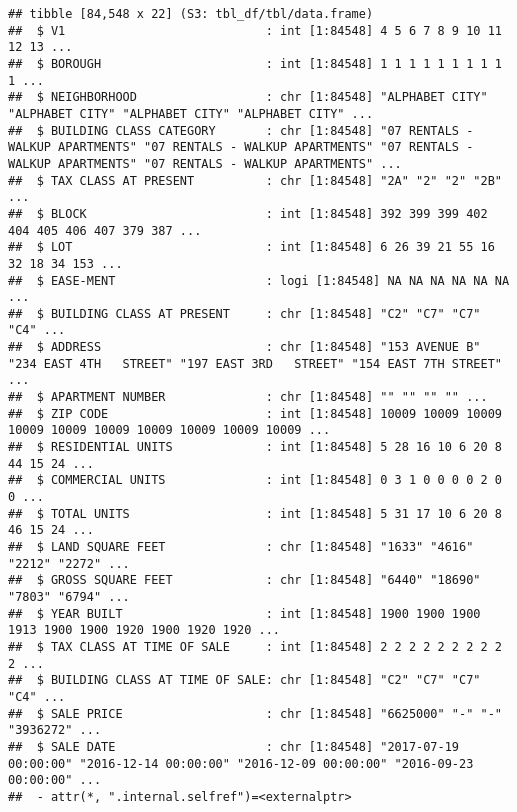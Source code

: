 \documentclass[
  a3paper,
]{article}
\newenvironment{Shaded}{\begin{snugshade}}{\end{snugshade}}
\newcommand{\CommentTok}[1]{\textcolor[rgb]{0.56,0.35,0.01}{\textit{#1}}}
\newcommand{\KeywordTok}[1]{\textcolor[rgb]{0.13,0.29,0.53}{\textbf{#1}}}
\newcommand{\NormalTok}[1]{#1}
\newcommand{\OperatorTok}[1]{\textcolor[rgb]{0.81,0.36,0.00}{\textbf{#1}}}
\newcommand{\OtherTok}[1]{\textcolor[rgb]{0.56,0.35,0.01}{#1}}
\newcommand{\StringTok}[1]{\textcolor[rgb]{0.31,0.60,0.02}{#1}}
\begin{document}
\begin{verbatim}
## tibble [84,548 x 22] (S3: tbl_df/tbl/data.frame)
##  $ V1                            : int [1:84548] 4 5 6 7 8 9 10 11 12 13 ...
##  $ BOROUGH                       : int [1:84548] 1 1 1 1 1 1 1 1 1 1 ...
##  $ NEIGHBORHOOD                  : chr [1:84548] "ALPHABET CITY" "ALPHABET CITY" "ALPHABET CITY" "ALPHABET CITY" ...
##  $ BUILDING CLASS CATEGORY       : chr [1:84548] "07 RENTALS - WALKUP APARTMENTS" "07 RENTALS - WALKUP APARTMENTS" "07 RENTALS - WALKUP APARTMENTS" "07 RENTALS - WALKUP APARTMENTS" ...
##  $ TAX CLASS AT PRESENT          : chr [1:84548] "2A" "2" "2" "2B" ...
##  $ BLOCK                         : int [1:84548] 392 399 399 402 404 405 406 407 379 387 ...
##  $ LOT                           : int [1:84548] 6 26 39 21 55 16 32 18 34 153 ...
##  $ EASE-MENT                     : logi [1:84548] NA NA NA NA NA NA ...
##  $ BUILDING CLASS AT PRESENT     : chr [1:84548] "C2" "C7" "C7" "C4" ...
##  $ ADDRESS                       : chr [1:84548] "153 AVENUE B" "234 EAST 4TH   STREET" "197 EAST 3RD   STREET" "154 EAST 7TH STREET" ...
##  $ APARTMENT NUMBER              : chr [1:84548] "" "" "" "" ...
##  $ ZIP CODE                      : int [1:84548] 10009 10009 10009 10009 10009 10009 10009 10009 10009 10009 ...
##  $ RESIDENTIAL UNITS             : int [1:84548] 5 28 16 10 6 20 8 44 15 24 ...
##  $ COMMERCIAL UNITS              : int [1:84548] 0 3 1 0 0 0 0 2 0 0 ...
##  $ TOTAL UNITS                   : int [1:84548] 5 31 17 10 6 20 8 46 15 24 ...
##  $ LAND SQUARE FEET              : chr [1:84548] "1633" "4616" "2212" "2272" ...
##  $ GROSS SQUARE FEET             : chr [1:84548] "6440" "18690" "7803" "6794" ...
##  $ YEAR BUILT                    : int [1:84548] 1900 1900 1900 1913 1900 1900 1920 1900 1920 1920 ...
##  $ TAX CLASS AT TIME OF SALE     : int [1:84548] 2 2 2 2 2 2 2 2 2 2 ...
##  $ BUILDING CLASS AT TIME OF SALE: chr [1:84548] "C2" "C7" "C7" "C4" ...
##  $ SALE PRICE                    : chr [1:84548] "6625000" "-" "-" "3936272" ...
##  $ SALE DATE                     : chr [1:84548] "2017-07-19 00:00:00" "2016-12-14 00:00:00" "2016-12-09 00:00:00" "2016-09-23 00:00:00" ...
##  - attr(*, ".internal.selfref")=<externalptr>
\end{verbatim}

\begin{Shaded}
\end{Shaded}
\end{document}
